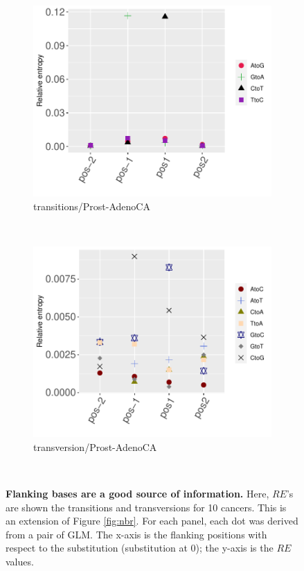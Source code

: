 \begin{figure}[ht!]\ContinuedFloat
    \begin{subfigure}{.5\textwidth}
    \includegraphics[scale=0.63]{graphics/nbr_transitions_Prost-AdenoCA.pdf}
    \caption{transitions/Prost-AdenoCA}
    \label{fig:transitions_prost-adenoca}
    \end{subfigure}
    ~
    \begin{subfigure}{.5\textwidth}
    \includegraphics[scale=0.63]{graphics/nbr_transversion_Prost-AdenoCA.pdf}
    \caption{transversion/Prost-AdenoCA}
    \label{fig:transversion_prost-adenoca}
    \end{subfigure} \\
    \vspace{0.5cm}
    \caption{\textbf{Flanking bases are a good source of information.} Here, $RE$'s are shown the transitions and transversions for 10 cancers. This is an extension of Figure \ref{fig:nbr}. For each panel, each dot was derived from a pair of GLM. The x-axis is the flanking positions with respect to the substitution (substitution at 0); the y-axis is the $RE$ values.}
    \label{fig:apdx_nbr}
\end{figure}